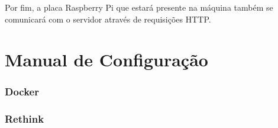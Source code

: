 \begin{apendicesenv}
Por fim, a placa Raspberry Pi que estará presente na máquina também se comunicará com
o servidor através de requisições HTTP.

\chapter{Manual de Configuração}

\subsection{Docker}

\subsection{Rethink}

\end{apendicesenv}
